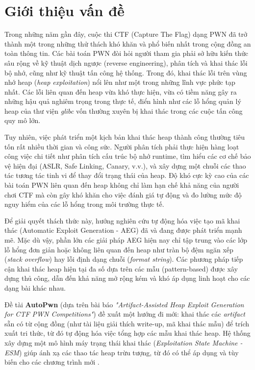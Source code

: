 \documentclass[final]{hcmuitthesis}
\begin{document}
\section{Giới thiệu vấn đề}
Trong những năm gần đây, cuộc thi CTF (Capture The Flag) dạng PWN đã trở thành một trong những thử thách khó khăn và phổ biến nhất trong cộng đồng an toàn thông tin. Các bài toán PWN đòi hỏi người tham gia phải sở hữu kiến thức sâu rộng về kỹ thuật dịch ngược (reverse engineering), phân tích và khai thác lỗi bộ nhớ, cũng như kỹ thuật tấn công hệ thống. Trong đó, khai thác lỗi trên vùng nhớ heap (\textit{heap exploitation}) nổi lên như một trong những lĩnh vực phức tạp nhất. Các lỗi liên quan đến heap vừa khó thực hiện, vừa có tiềm năng gây ra những hậu quả nghiêm trọng trong thực tế, điển hình như các lỗ hổng quản lý heap của thư viện \textit{glibc} vốn thường xuyên bị khai thác trong các cuộc tấn công quy mô lớn.

Tuy nhiên, việc phát triển một kịch bản khai thác heap thành công thường tiêu tốn rất nhiều thời gian và công sức. Người phân tích phải thực hiện hàng loạt công việc chi tiết như phân tích cấu trúc bộ nhớ runtime, tìm hiểu các cơ chế bảo vệ hiện đại (ASLR, Safe Linking, Canary, v.v.), và xây dựng một chuỗi các thao tác tương tác tinh vi để thay đổi trạng thái của heap. Độ khó cực kỳ cao của các bài toán PWN liên quan đến heap không chỉ làm hạn chế khả năng của người chơi CTF mà còn gây khó khăn cho việc đánh giá tự động và đo lường mức độ nguy hiểm của các lỗ hổng trong môi trường thực tế.

Để giải quyết thách thức này, hướng nghiên cứu tự động hóa việc tạo mã khai thác (Automatic Exploit Generation - AEG) đã và đang được phát triển mạnh mẽ. Mặc dù vậy, phần lớn các giải pháp AEG hiện nay chỉ tập trung vào các lớp lỗ hổng đơn giản hoặc không liên quan đến heap như tràn bộ đệm ngăn xếp (\textit{stack overflow}) hay lỗi định dạng chuỗi (\textit{format string}). Các phương pháp tiếp cận khai thác heap hiện tại đa số dựa trên các mẫu (pattern-based) được xây dựng thủ công, dẫn đến khả năng mở rộng kém và khó áp dụng linh hoạt cho các dạng bài khác nhau.

Đề tài \textbf{AutoPwn} (dựa trên bài báo \textit{"Artifact-Assisted Heap Exploit Generation for CTF PWN Competitions"}) đề xuất một hướng đi mới: khai thác các \textit{artifact} sẵn có từ cộng đồng (như tài liệu giải thích write-up, mã khai thác mẫu) để trích xuất tri thức, từ đó tự động hóa việc tổng hợp các mẫu khai thác heap. Hệ thống xây dựng một mô hình máy trạng thái khai thác (\textit{Exploitation State Machine - ESM}) giúp ánh xạ các thao tác heap trừu tượng, từ đó có thể áp dụng và tùy biến cho các chương trình mới \cite{shoshitaishvili2016sok,ctfwikiheap}.
\end{document}

